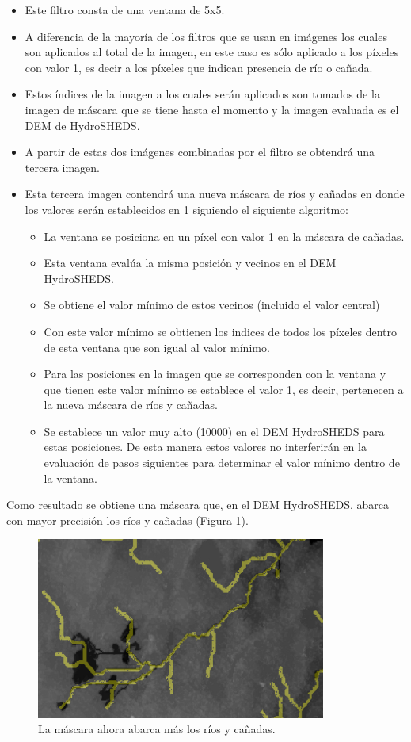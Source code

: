 \documentclass[10pt,a4paper, twoside]{report}
\begin{document}
\begin{itemize}
	\item Este filtro consta de una ventana de 5x5. 
	\item A diferencia de la mayoría de los filtros que se usan en imágenes los cuales son aplicados al total de la imagen, en este caso es sólo aplicado a los píxeles con valor 1, es decir a los píxeles que indican presencia de río o cañada. 
	\item Estos índices de la imagen a los cuales serán aplicados son tomados de la imagen de máscara que se tiene hasta el momento y la imagen evaluada es el DEM de HydroSHEDS.
	\item A partir de estas dos imágenes combinadas por el filtro se obtendrá una tercera imagen.
	\item Esta tercera imagen contendrá una nueva máscara de ríos y cañadas en donde los valores serán establecidos en 1 siguiendo el siguiente algoritmo:	
	\begin{itemize}
		\item La ventana se posiciona en un píxel con valor 1 en la máscara de cañadas.
		\item Esta ventana evalúa la misma posición y vecinos en el DEM HydroSHEDS.
		\item Se obtiene el valor mínimo de estos vecinos (incluido el valor central)
		\item Con este valor mínimo se obtienen los indices de todos los píxeles dentro de esta ventana que son igual al valor mínimo.
		\item Para las posiciones en la imagen que se corresponden con la ventana y que tienen este valor mínimo se establece el valor 1, es decir, pertenecen a la nueva máscara de ríos y cañadas.
		\item Se establece un valor muy alto (10000) en el DEM HydroSHEDS para estas posiciones. De esta manera estos valores no interferirán en la evaluación de pasos siguientes para determinar el valor mínimo dentro de la ventana.
	\end{itemize}
\end{itemize}

Como resultado se obtiene una máscara que, en el DEM HydroSHEDS, abarca con mayor precisión los ríos y cañadas (Figura \ref{riversEnrouted}).


\begin{figure}[H]
   \centering      
   \includegraphics[width=0.85\textwidth]{imagenes/riversEnrouted.jpg}
 \caption{La máscara ahora abarca más los ríos y cañadas.}
 \label{riversEnrouted}
\end{figure}
\end{document}
